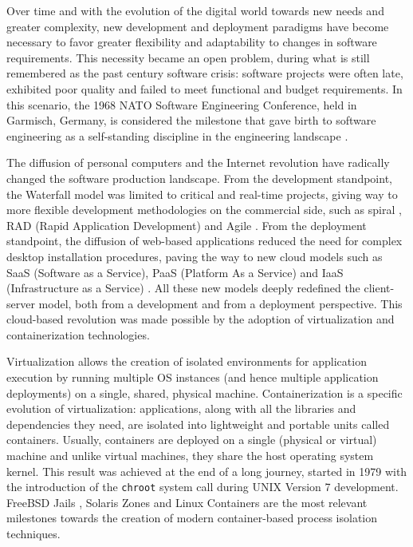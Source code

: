 Over time and with the evolution of the digital world towards new needs and greater complexity, new development and deployment paradigms have become necessary to favor greater flexibility and adaptability to changes in software requirements. 
This necessity became an open problem, during what is still remembered as the past century software crisis: software projects were often late, exhibited poor quality and failed to meet functional and budget requirements.
In this scenario, the 1968 NATO Software Engineering Conference, held in Garmisch, Germany, is considered the milestone that gave birth to software engineering as a self-standing discipline in the engineering landscape \cite{nato1968}.

The diffusion of personal computers and the Internet revolution have radically changed the software production landscape.
From the development standpoint, the Waterfall model was limited to critical and real-time projects, giving way to more flexible development methodologies on the commercial side, such as spiral \cite{boehm1988spiral}, RAD (Rapid Application Development) \cite{martinRapidApplicationDevelopment1991} and Agile \cite{ManifestoAgileSoftware}. 
From the deployment standpoint, the diffusion of web-based applications reduced the need for complex desktop installation procedures, paving the way to new cloud models such as SaaS (Software as a Service), PaaS (Platform As a Service) and IaaS (Infrastructure as a Service) \cite{manvi2014resource}. 
All these new models deeply redefined the client-server model, both from a development and from a deployment perspective. 
This cloud-based revolution was made possible by the adoption of virtualization and containerization technologies.

Virtualization allows the creation of isolated environments for application execution by running multiple OS instances (and hence multiple application deployments) on a single, shared, physical machine. \newline
Containerization is a specific evolution of virtualization: applications, along with all the libraries and dependencies they need, are isolated into lightweight and portable units called containers. Usually, containers are deployed on a single (physical or virtual) machine and unlike virtual machines, they share the host operating system kernel. 
This result was achieved at the end of a long journey, started in 1979 with the introduction of the \texttt{chroot} system call \cite{kerriskLinuxProgrammingInterface2010} during UNIX Version 7 development. FreeBSD Jails \cite{kampJailsConfiningOmnipotent}, Solaris Zones \cite{priceSolarisZonesOperating2004} and Linux Containers \cite{LinuxContainers} are the most relevant milestones towards the creation of modern container-based process isolation techniques.

